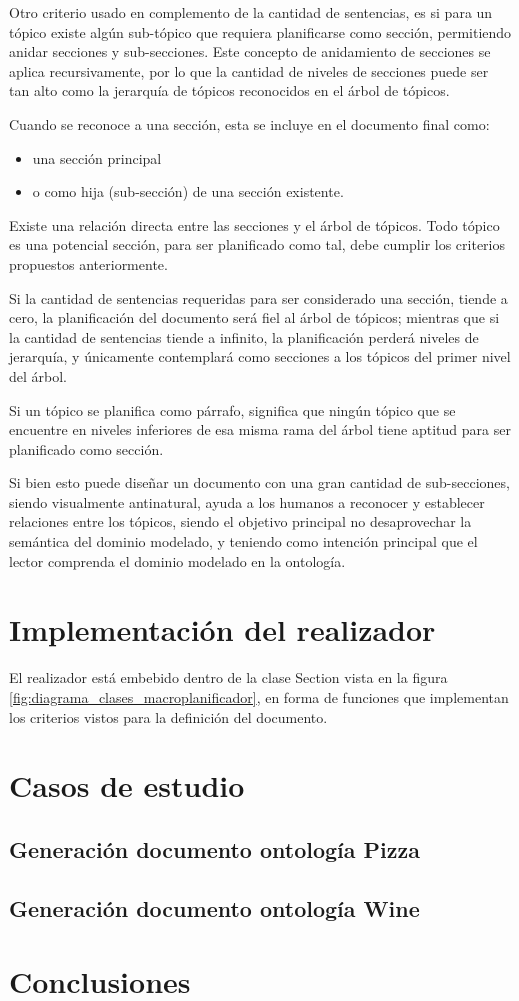 Otro criterio usado en complemento de la cantidad de sentencias, es si para un tópico existe algún sub-tópico que requiera planificarse como sección, permitiendo anidar secciones y sub-secciones. Este concepto de anidamiento de secciones se aplica recursivamente, por lo que la cantidad de niveles de secciones puede ser tan alto como la jerarquía de tópicos reconocidos en el árbol de tópicos. 

Cuando se reconoce a una sección, esta se incluye en el documento final como: \begin{itemize}
    \item una sección principal
    \item o como hija (sub-sección) de una sección existente.
\end{itemize}

Existe una relación directa entre las secciones y el árbol de tópicos. Todo tópico es una potencial sección, para ser planificado como tal, debe cumplir los criterios propuestos anteriormente. 

Si la cantidad de sentencias requeridas para ser considerado una sección, tiende a cero, la planificación del documento será fiel al árbol de tópicos; mientras que si la cantidad de sentencias tiende a infinito, la planificación perderá niveles de jerarquía, y únicamente contemplará como secciones a los tópicos del primer nivel del árbol.   

Si un tópico se planifica como párrafo, significa que ningún tópico que se encuentre en niveles inferiores de esa misma rama del árbol tiene aptitud para ser planificado como sección.

Si bien esto puede diseñar un documento con una gran cantidad de sub-secciones, siendo visualmente antinatural, ayuda a los humanos a reconocer y establecer relaciones entre los tópicos, siendo el objetivo principal no desaprovechar la semántica del dominio modelado, y teniendo como intención principal que el lector comprenda el dominio modelado en la ontología.

\section{Implementación del realizador}
El realizador está embebido dentro de la clase Section vista en la figura \ref{fig:diagrama_clases_macroplanificador}, en forma de funciones que implementan los criterios vistos para la definición del documento.


\section{Casos de estudio}

\subsection{Generación documento ontología Pizza}

\subsection{Generación documento ontología Wine}

\section{Conclusiones}

